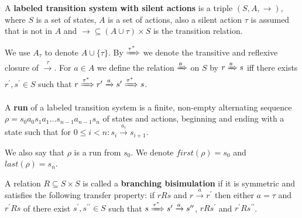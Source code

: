 \begin{definition}
  A {\bf labeled transition system with silent actions} is a triple $(S, A, \rightarrow)$, where $S$ is a set of states, $A$ is a set of actions, also a silent action $\tau$ is assumed that is not in $A$ and $\rightarrow\subseteq (A\cup\tau)\times S$ is the transition relation.
\end{definition}

We use $A_\tau$ to denote $A\cup\{\tau\}$.
By $\xRightarrow{\tau^*}$ we denote the transitive and reflexive closure of $\xrightarrow{\tau}$. For $a\in A$ we define the relation $\xRightarrow{a}$ on $S$ by $r\xRightarrow{a}s$ iff there exists $r^\prime, s^\prime\in S$ such that $r \xRightarrow{\tau^*} r^\prime \xrightarrow{a} s^\prime \xRightarrow{\tau^*} s$.

\begin{definition}
  A {\bf run} of a labeled transition system is a finite, non-empty alternating sequence $\rho = s_0a_0s_1a_1\ldots s_{n-1}a_{n-1}s_n$ of states and actions, beginning and ending with a state such that for $0\leq i<n: s_i\xrightarrow{a_i}s_{i+1}$.
\end{definition}

We also say that $\rho$ is a run from $s_0$. We denote $first(\rho)=s_0$ and $last(\rho)=s_n$.

\begin{definition}
  A relation $R\subseteq S\times S$ is called a {\bf branching bisimulation} if it is symmetric and satisfies the following transfer property: if $rRs$ and $r\xrightarrow{a} r^\prime$ then either $a=\tau$ and $r^\prime Rs$ of there exist $s^\prime,s^{\prime\prime}\in S$ such that $s \xRightarrow{\tau^*} s^\prime \xrightarrow{a} s^{\prime\prime}$, $rRs^\prime$ and $r^\prime Rs^{\prime\prime}$.
\end{definition}

